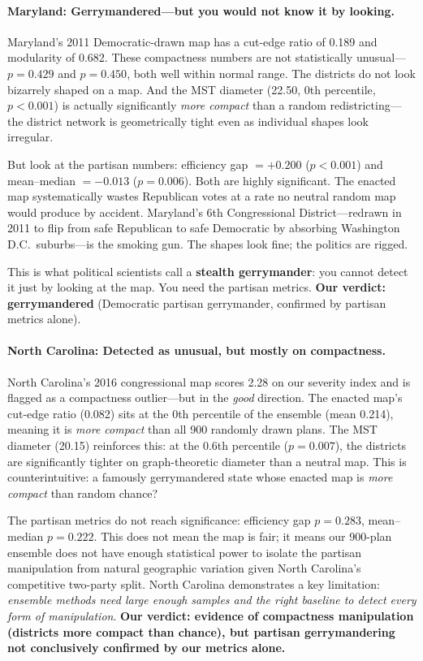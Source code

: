 \documentclass[11pt]{article}
\begin{document}
\paragraph{Maryland: Gerrymandered---but you would not know it by looking.}
Maryland's 2011 Democratic-drawn map has a cut-edge ratio of 0.189 and
modularity of 0.682. These compactness numbers are not statistically
unusual---$p = 0.429$ and $p = 0.450$, both well within normal range.
The districts do not look bizarrely shaped on a map. And the MST diameter
(22.50, 0th percentile, $p < 0.001$) is actually significantly
\emph{more compact} than a random redistricting---the district network
is geometrically tight even as individual shapes look irregular.

But look at the partisan numbers: efficiency gap $= +0.200$ ($p < 0.001$)
and mean--median $= -0.013$ ($p = 0.006$). Both are highly significant.
The enacted map systematically wastes Republican votes at a rate no
neutral random map would produce by accident. Maryland's 6th
Congressional District---redrawn in 2011 to flip from safe Republican to
safe Democratic by absorbing Washington D.C.\ suburbs---is the smoking
gun. The shapes look fine; the politics are rigged.

This is what political scientists call a \textbf{stealth gerrymander}:
you cannot detect it just by looking at the map. You need the partisan
metrics. \textbf{Our verdict: gerrymandered} (Democratic partisan
gerrymander, confirmed by partisan metrics alone).

\paragraph{North Carolina: Detected as unusual, but mostly on compactness.}
North Carolina's 2016 congressional map scores 2.28 on our severity
index and is flagged as a compactness outlier---but in the \emph{good}
direction. The enacted map's cut-edge ratio (0.082) sits at the 0th
percentile of the ensemble (mean 0.214), meaning it is \emph{more
compact} than all 900 randomly drawn plans. The MST diameter (20.15)
reinforces this: at the 0.6th percentile ($p = 0.007$), the districts
are significantly tighter on graph-theoretic diameter than a neutral map.
This is counterintuitive: a famously gerrymandered state whose enacted
map is \emph{more compact} than random chance?

The partisan metrics do not reach significance: efficiency gap
$p = 0.283$, mean--median $p = 0.222$. This does not mean the map is
fair; it means our 900-plan ensemble does not have enough statistical
power to isolate the partisan manipulation from natural geographic
variation given North Carolina's competitive two-party split. North
Carolina demonstrates a key limitation: \emph{ensemble methods need
large enough samples and the right baseline to detect every form of
manipulation}. \textbf{Our verdict: evidence of compactness manipulation
(districts more compact than chance), but partisan gerrymandering not
conclusively confirmed by our metrics alone.}
\end{document}
